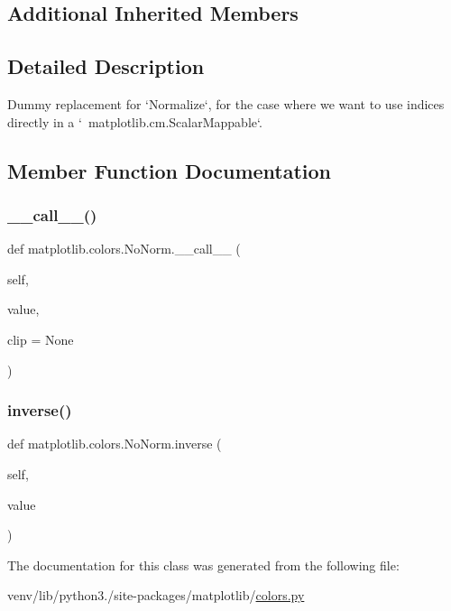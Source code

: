 \subsection*{Additional Inherited Members}


\subsection{Detailed Description}
\begin{DoxyVerb}Dummy replacement for `Normalize`, for the case where we want to use
indices directly in a `~matplotlib.cm.ScalarMappable`.
\end{DoxyVerb}
 

\subsection{Member Function Documentation}
\mbox{\label{classmatplotlib_1_1colors_1_1NoNorm_ac8772102fca48f3b0f1a22ae4e532114}} 
\subsubsection{\texorpdfstring{\+\_\+\+\_\+call\+\_\+\+\_\+()}{\_\_call\_\_()}}
{\footnotesize\ttfamily def matplotlib.\+colors.\+No\+Norm.\+\_\+\+\_\+call\+\_\+\+\_\+ (\begin{DoxyParamCaption}\item[{}]{self,  }\item[{}]{value,  }\item[{}]{clip = {\ttfamily None} }\end{DoxyParamCaption})}

\mbox{\label{classmatplotlib_1_1colors_1_1NoNorm_a2135d15daa15746706005eb8c14813e3}} 
\subsubsection{\texorpdfstring{inverse()}{inverse()}}
{\footnotesize\ttfamily def matplotlib.\+colors.\+No\+Norm.\+inverse (\begin{DoxyParamCaption}\item[{}]{self,  }\item[{}]{value }\end{DoxyParamCaption})}



The documentation for this class was generated from the following file\+:\begin{DoxyCompactItemize}
\item 
venv/lib/python3./site-\/packages/matplotlib/\hyperlink{colors_8py}{colors.\+py}\end{DoxyCompactItemize}
